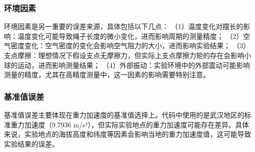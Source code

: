 \subsubsection{环境因素}  
环境因素是另一重要的误差来源，具体包括以下几点：
（1）温度变化对摆长的影响：温度变化可能导致绳子长度的微小变化，进而影响周期的测量精度；
（2）空气密度变化：空气密度的变化会影响空气阻力的大小，进而影响实验结果；
（3）支点摩擦：理想情况下假设支点无摩擦力，但实际上支点摩擦力矩的存在会影响小球的运动，进而影响测量结果；
（4）外部振动：实验环境中的外部震动可能影响测量的精度，尤其在高精度测量中，这一因素的影响需要特别注意。

\subsubsection{基准值误差}  
基准值误差主要体现在重力加速度的基准值选择上。代码中使用的是武汉地区的标准重力加速度（9.7936 m/s²），但实际实验地点的重力加速度可能存在差异。具体来说，实验地点的海拔高度和纬度等因素会影响当地的重力加速度值，这可能导致实验结果的误差。 